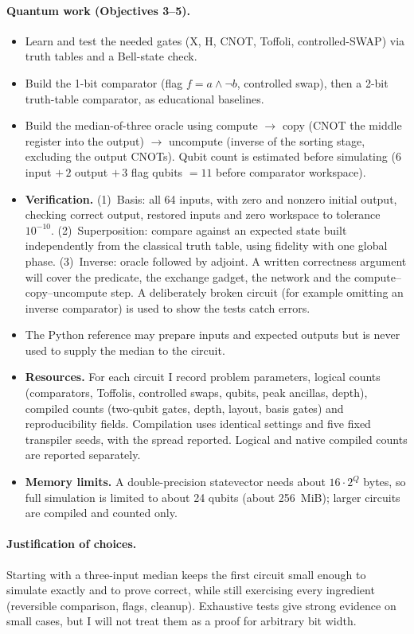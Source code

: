 \documentclass[11pt,a4paper]{article}
\begin{document}
\paragraph{Quantum work (Objectives 3--5).}
\begin{itemize}
  \item Learn and test the needed gates (X, H, CNOT, Toffoli, controlled-SWAP) via truth tables and a Bell-state check.
  \item Build the 1-bit comparator (flag $f=a\wedge\neg b$, controlled swap), then a 2-bit truth-table comparator, as educational baselines.
  \item Build the median-of-three oracle using compute $\to$ copy (CNOT the middle register into the output) $\to$ uncompute (inverse of the sorting stage, excluding the output CNOTs). Qubit count is estimated before simulating ($6$ input $+\,2$ output $+\,3$ flag qubits $=11$ before comparator workspace).
  \item \textbf{Verification.} (1)~Basis: all 64 inputs, with zero and nonzero initial output, checking correct output, restored inputs and zero workspace to tolerance $10^{-10}$. (2)~Superposition: compare against an expected state built independently from the classical truth table, using fidelity with one global phase. (3)~Inverse: oracle followed by adjoint. A written correctness argument will cover the predicate, the exchange gadget, the network and the compute--copy--uncompute step. A deliberately broken circuit (for example omitting an inverse comparator) is used to show the tests catch errors.
  \item The Python reference may prepare inputs and expected outputs but is never used to supply the median to the circuit.
  \item \textbf{Resources.} For each circuit I record problem parameters, logical counts (comparators, Toffolis, controlled swaps, qubits, peak ancillas, depth), compiled counts (two-qubit gates, depth, layout, basis gates) and reproducibility fields. Compilation uses identical settings and five fixed transpiler seeds, with the spread reported. Logical and native compiled counts are reported separately.
  \item \textbf{Memory limits.} A double-precision statevector needs about $16\cdot 2^Q$ bytes, so full simulation is limited to about 24 qubits (about 256~MiB); larger circuits are compiled and counted only.
\end{itemize}

\paragraph{Justification of choices.}
Starting with a three-input median keeps the first circuit small enough to simulate exactly and to prove correct, while still exercising every ingredient (reversible comparison, flags, cleanup). Exhaustive tests give strong evidence on small cases, but I will not treat them as a proof for arbitrary bit width.
\end{document}
